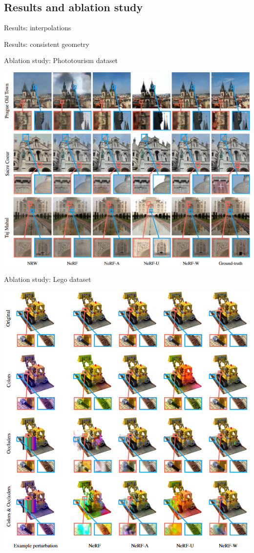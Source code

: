 \documentclass[aspectratio=1610]{beamer}
\begin{document}
\subsection{Results and ablation study}
\begin{frame}{Results: interpolations}
    \begin{figure}[H]
    \end{figure}
\end{frame}
\begin{frame}{Results: consistent geometry}
    \begin{figure}[H]
    \end{figure}
\end{frame}
\begin{frame}{Ablation study: Phototourism dataset}
    \begin{center}
        \includegraphics[width=.69\textwidth]{res-photo.png}
    \end{center}
\end{frame}
\begin{frame}{Ablation study: Lego dataset}
    \begin{center}
        \includegraphics[width=.51\textwidth]{results-lego.png}
    \end{center}
\end{frame}
\end{document}
